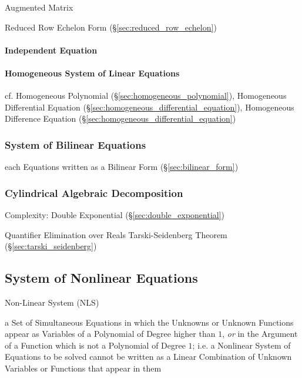 Augmented Matrix

Reduced Row Echelon Form (\S\ref{sec:reduced_row_echelon})



\paragraph{Independent Equation}\label{sec:independent_equation}\hfill

\paragraph{Homogeneous System of Linear Equations}\hfill
\label{sec:homogeneous_linear_equation_system}

cf. Homogeneous Polynomial (\S\ref{sec:homogeneous_polynomial}), Homogeneous
Differential Equation (\S\ref{sec:homogeneous_differential_equation}),
Homogeneous Difference Equation (\S\ref{sec:homogeneous_differential_equation})



\subsubsection{System of Bilinear Equations}\label{sec:bilinear_equation_system}

each Equations written as a Bilinear Form (\S\ref{sec:bilinear_form})



\subsubsection{Cylindrical Algebraic Decomposition}
\label{sec:cylindrical_algebraic_decomposition}

Complexity: Double Exponential (\S\ref{sec:double_exponential})

Quantifier Elimination over Reals \fist Tarski-Seidenberg Theorem
(\S\ref{sec:tarski_seidenberg})



\subsection{System of Nonlinear Equations}\label{sec:nonlinear_equation_system}

Non-Linear System (NLS)

a Set of Simultaneous Equations in which the Unknowns or Unknown Functions
appear as Variables of a Polynomial of Degree higher than $1$, \emph{or} in the
Argument of a Function which is not a Polynomial of Degree $1$; i.e. a
Nonlinear System of Equations to be solved cannot be written as a Linear
Combination of Unknown Variables or Functions that appear in them

